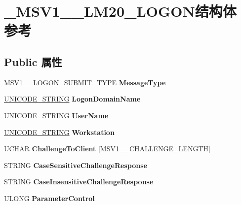 \hypertarget{struct___m_s_v1__0___l_m20___l_o_g_o_n}{}\section{\+\_\+\+M\+S\+V1\+\_\+\_\+\+L\+M20\+\_\+\+L\+O\+G\+O\+N结构体 参考}
\label{struct___m_s_v1__0___l_m20___l_o_g_o_n}
\subsection*{Public 属性}
\begin{DoxyCompactItemize}
\item 
\mbox{\label{struct___m_s_v1__0___l_m20___l_o_g_o_n_ad2613911b40a9c5c8182a04953603408}} 
M\+S\+V1\+\_\+\_\+\+L\+O\+G\+O\+N\+\_\+\+S\+U\+B\+M\+I\+T\+\_\+\+T\+Y\+PE {\bfseries Message\+Type}
\item 
\mbox{\label{struct___m_s_v1__0___l_m20___l_o_g_o_n_a788b1d9b9e9c74ae994a2e419977d705}} 
\hyperlink{struct___u_n_i_c_o_d_e___s_t_r_i_n_g}{U\+N\+I\+C\+O\+D\+E\+\_\+\+S\+T\+R\+I\+NG} {\bfseries Logon\+Domain\+Name}
\item 
\mbox{\label{struct___m_s_v1__0___l_m20___l_o_g_o_n_a01709c04a7cc1e5421b14c678562a1a8}} 
\hyperlink{struct___u_n_i_c_o_d_e___s_t_r_i_n_g}{U\+N\+I\+C\+O\+D\+E\+\_\+\+S\+T\+R\+I\+NG} {\bfseries User\+Name}
\item 
\mbox{\label{struct___m_s_v1__0___l_m20___l_o_g_o_n_aa327717a14784d44a22f03875fba1553}} 
\hyperlink{struct___u_n_i_c_o_d_e___s_t_r_i_n_g}{U\+N\+I\+C\+O\+D\+E\+\_\+\+S\+T\+R\+I\+NG} {\bfseries Workstation}
\item 
\mbox{\label{struct___m_s_v1__0___l_m20___l_o_g_o_n_a2f531966da4a2d216012d3dc48155652}} 
U\+C\+H\+AR {\bfseries Challenge\+To\+Client} \mbox{[}M\+S\+V1\+\_\+\_\+\+C\+H\+A\+L\+L\+E\+N\+G\+E\+\_\+\+L\+E\+N\+G\+TH\mbox{]}
\item 
\mbox{\label{struct___m_s_v1__0___l_m20___l_o_g_o_n_ac6435f43ce5850afc9809f4248aacf40}} 
S\+T\+R\+I\+NG {\bfseries Case\+Sensitive\+Challenge\+Response}
\item 
\mbox{\label{struct___m_s_v1__0___l_m20___l_o_g_o_n_a3fdf5c8bd825fa1792a69ca25ba7b335}} 
S\+T\+R\+I\+NG {\bfseries Case\+Insensitive\+Challenge\+Response}
\item 
\mbox{\label{struct___m_s_v1__0___l_m20___l_o_g_o_n_ab061701e2365755e3ca8aedcd3469b44}} 
U\+L\+O\+NG {\bfseries Parameter\+Control}
\end{DoxyCompactItemize}


